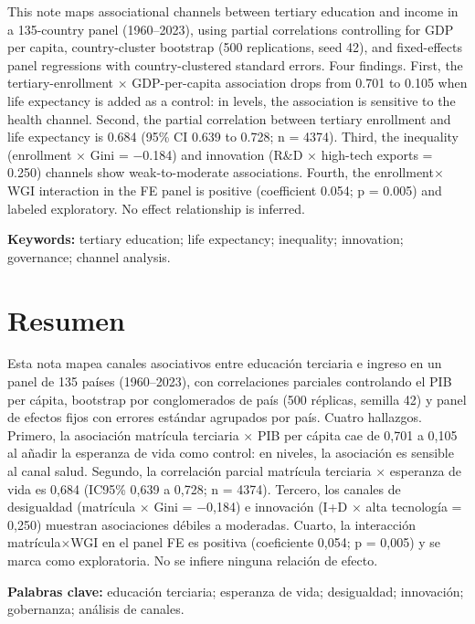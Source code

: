 \documentclass[12pt,a4paper]{article}
\begin{document}
This note maps associational channels between tertiary education and income in a 135-country panel (1960--2023), using partial correlations controlling for GDP per capita, country-cluster bootstrap (500 replications, seed 42), and fixed-effects panel regressions with country-clustered standard errors. Four findings. First, the tertiary-enrollment $\times$ GDP-per-capita association drops from 0.701 to 0.105 when life expectancy is added as a control: in levels, the association is sensitive to the health channel. Second, the partial correlation between tertiary enrollment and life expectancy is 0.684 (95\% CI 0.639 to 0.728; n = 4374). Third, the inequality (enrollment $\times$ Gini = $-$0.184) and innovation (R\&D $\times$ high-tech exports = 0.250) channels show weak-to-moderate associations. Fourth, the enrollment$\times$WGI interaction in the FE panel is positive (coefficient 0.054; p = 0.005) and labeled exploratory. No effect relationship is inferred.

\noindent\textbf{Keywords:} tertiary education; life expectancy; inequality; innovation; governance; channel analysis.

\section*{Resumen}

Esta nota mapea canales asociativos entre educación terciaria e ingreso en un panel de 135 países (1960--2023), con correlaciones parciales controlando el PIB per cápita, bootstrap por conglomerados de país (500 réplicas, semilla 42) y panel de efectos fijos con errores estándar agrupados por país. Cuatro hallazgos. Primero, la asociación matrícula terciaria $\times$ PIB per cápita cae de 0,701 a 0,105 al añadir la esperanza de vida como control: en niveles, la asociación es sensible al canal salud. Segundo, la correlación parcial matrícula terciaria $\times$ esperanza de vida es 0,684 (IC95\% 0,639 a 0,728; n = 4374). Tercero, los canales de desigualdad (matrícula $\times$ Gini = $-$0,184) e innovación (I+D $\times$ alta tecnología = 0,250) muestran asociaciones débiles a moderadas. Cuarto, la interacción matrícula$\times$WGI en el panel FE es positiva (coeficiente 0,054; p = 0,005) y se marca como exploratoria. No se infiere ninguna relación de efecto.

\noindent\textbf{Palabras clave:} educación terciaria; esperanza de vida; desigualdad; innovación; gobernanza; análisis de canales.

\vspace{0.6cm}
\end{document}
